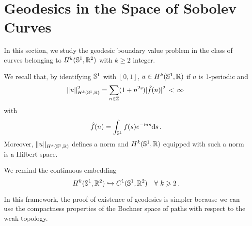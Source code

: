 
\section{Geodesics in the Space of Sobolev Curves}\label{Hs}

In this section, we study the geodesic boundary value problem in the class of curves belonging to $H^k(\mathbb{S}^1,\mathbb{R}^2)$ with $k\geq 2$ integer.


\begin{simplified}
 We recall that, by identifying $\mathbb{S}^1$ with $[0,1]$,  $u\in H^k(\mathbb{S}^1,{\mathbb R})$ if $u$ is 1-periodic and 
$$\|u\|_{H^k(\mathbb{S}^1,{\mathbb R})}^2 = \sum_{n\in \mathbb{Z}} (1+n^{2s})|\hat f(n)|^2 \,<\, \infty\,$$
with 
$$\hat f(n) = \int_{\mathbb{S}^1} f(s) e^{-\mathrm{i} ns} \mathrm{d} s\,.$$
Moreover, $\|u\|_{H^k(\mathbb{S}^1,{\mathbb R})}$ defines a norm and $H^k(\mathbb{S}^1,{\mathbb R})$ equipped with such a norm is a Hilbert space. 
\end{simplified}
We remind the continuous embedding 
\begin{equation}\label{embedding1}
H^k(\mathbb{S}^1,\mathbb{R}^2) \hookrightarrow C^{1}(\mathbb{S}^1,\mathbb{R}^2) \quad \forall \, \, k\geqslant 2\,.
\end{equation}



In this framework, the proof of  existence of geodesics is simpler because we can use the compactness properties of the Bochner space of paths with respect to the weak topology. 



